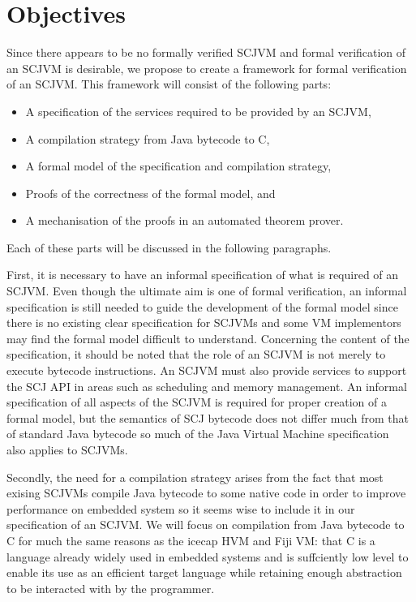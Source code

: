 \documentclass[a4paper,10pt]{report}
\begin{document}
\section{Objectives}

Since there appears to be no formally verified SCJVM and formal
verification of an SCJVM is desirable, we propose to create a
framework for formal verification of an SCJVM.
This framework will consist of the following parts:
\begin{itemize}
\item A specification of the services required to be provided by an
  SCJVM,
\item A compilation strategy from Java bytecode to C,
\item A formal model of the specification and compilation strategy,
\item Proofs of the correctness of the formal model, and
\item A mechanisation of the proofs in an automated theorem prover.
\end{itemize}
Each of these parts will be discussed in the following paragraphs.

First, it is necessary to have an informal specification of what is
required of an SCJVM.
Even though the ultimate aim is one of formal verification, an
informal specification is still needed to guide the development of the
formal model since there is no existing clear specification for SCJVMs
and some VM implementors may find the formal model difficult to
understand.
Concerning the content of the specification, it should be noted that
the role of an SCJVM is not merely to execute bytecode instructions.
An SCJVM must also provide services to support the SCJ API in areas
such as scheduling and memory management.
An informal specification of all aspects of the SCJVM is required for
proper creation of a formal model, but the semantics of SCJ bytecode
does not differ much from that of standard Java bytecode so much of
the Java Virtual Machine specification~\cite{lindholm2014} also
applies to SCJVMs.

Secondly, the need for a compilation strategy arises from the fact
that most exising SCJVMs compile Java bytecode to some native code in
order to improve performance on embedded system so it seems wise to
include it in our specification of an SCJVM.
We will focus on compilation from Java bytecode to C for much the same
reasons as the icecap HVM and Fiji VM: that C is a language already
widely used in embedded systems and is suffciently low level to enable
its use as an efficient target language while retaining enough
abstraction to be interacted with by the programmer.
\end{document}
